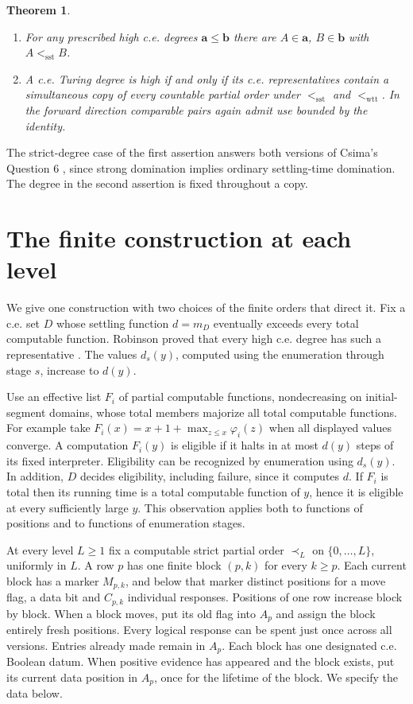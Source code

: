 \documentclass[11pt]{article}
\newtheorem{theorem}{Theorem}
\newcommand{\sst}{\mathrm{sst}}
\newcommand{\wtt}{\mathrm{wtt}}
\begin{document}
\begin{theorem}\label{degrees}
\begin{enumerate}
\item For any prescribed high c.e. degrees $\mathbf a\le\mathbf b$ there are $A\in\mathbf a$, $B\in\mathbf b$ with $A<_{\sst}B$.
\item A c.e. Turing degree is high if and only if its c.e. representatives contain a simultaneous copy of every countable partial order under $<_{\sst}$ and $<_{\wtt}$. In the forward direction comparable pairs again admit use bounded by the identity.
\end{enumerate}
\end{theorem}
The strict-degree case of the first assertion answers both versions of Csima's Question 6 \cite{survey}, since strong domination implies ordinary settling-time domination. The degree in the second assertion is fixed throughout a copy.

\section{The finite construction at each level}
We give one construction with two choices of the finite orders that direct it. Fix a c.e. set $D$ whose settling function $d=m_D$ eventually exceeds every total computable function. Robinson proved that every high c.e. degree has such a representative \cite{robinson,survey}. The values $d_s(y)$, computed using the enumeration through stage $s$, increase to $d(y)$.

Use an effective list $F_i$ of partial computable functions, nondecreasing on initial-segment domains, whose total members majorize all total computable functions. For example take $F_i(x)=x+1+\max_{z\le x}\varphi_i(z)$ when all displayed values converge. A computation $F_i(y)$ is eligible if it halts in at most $d(y)$ steps of its fixed interpreter. Eligibility can be recognized by enumeration using $d_s(y)$. In addition, $D$ decides eligibility, including failure, since it computes $d$. If $F_i$ is total then its running time is a total computable function of $y$, hence it is eligible at every sufficiently large $y$. This observation applies both to functions of positions and to functions of enumeration stages.

At every level $L\ge1$ fix a computable strict partial order $\prec_L$ on $\{0,\ldots,L\}$, uniformly in $L$. A row $p$ has one finite block $(p,k)$ for every $k\ge p$. Each current block has a marker $M_{p,k}$, and below that marker distinct positions for a move flag, a data bit and $C_{p,k}$ individual responses. Positions of one row increase block by block. When a block moves, put its old flag into $A_p$ and assign the block entirely fresh positions. Every logical response can be spent just once across all versions. Entries already made remain in $A_p$. Each block has one designated c.e. Boolean datum. When positive evidence has appeared and the block exists, put its current data position in $A_p$, once for the lifetime of the block. We specify the data below.
\end{document}
